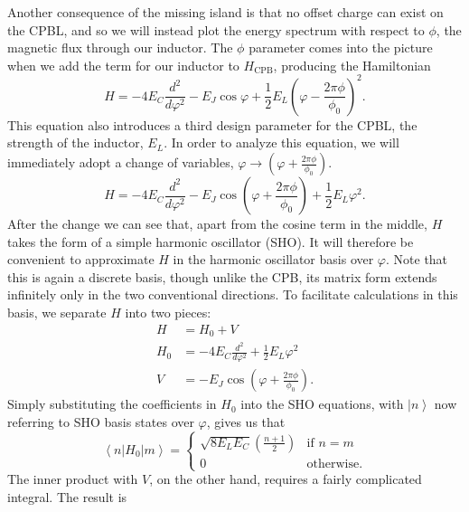 \documentclass[twocolumn]{revtex4}
\newcommand{\ket}[1]{\left| #1 \right>}
\newcommand{\innerp}[3]{\textstyle\left< #1 \left| #2 \right| #3 \right>}
\begin{document}
Another consequence of the missing island is that no offset charge can
exist on the CPBL, and so we will instead plot the energy spectrum
with respect to $\phi$, the magnetic flux through our inductor. The
$\phi$ parameter comes into the picture when we add the term for our
inductor to $H_{\text{CPB}}$, producing the Hamiltonian
\begin{equation}
  H = -4E_C\frac{d^2}{d\varphi^2}-E_J\cos{\varphi}+\frac{1}{2}
  E_L\left(\varphi-\frac{2\pi\phi}{\phi_0} \right)^2.
\end{equation}
This equation also introduces a third design parameter for the CPBL,
the strength of the inductor, $E_L$. In order to analyze this
equation, we will immediately adopt a change of variables, $\varphi
\rightarrow (\varphi + \frac{2\pi\phi}{\phi_0})$.
\begin{equation}
  \label{H}
  H = -4E_C\frac{d^2}{d\varphi^2}-E_J\cos\left(\varphi+
    \frac{2\pi\phi}{\phi_0}\right)+
  \frac{1}{2} E_L\varphi^2.
\end{equation}
After the change we can see that, apart from the cosine term in the
middle, $H$ takes the form of a simple harmonic oscillator (SHO). It
will therefore be convenient to approximate $H$ in the harmonic
oscillator basis over $\varphi$. Note that this is again a discrete
basis, though unlike the CPB, its matrix form extends infinitely only
in the two conventional directions. To facilitate calculations in this
basis, we separate $H$ into two pieces:
\begin{align}
  H & = H_0 + V\\
  H_0 & = -4E_C\frac{d^2}{d\varphi^2} +
  \frac{1}{2} E_L\varphi^2 \\
  V & = -E_J\cos\left(\varphi + \frac{2\pi\phi}{\phi_0}\right).
\end{align}
Simply substituting the coefficients in $H_0$ into the SHO equations,
with $\ket{n}$ now referring to SHO basis states over $\varphi$, gives
us that
\begin{equation}
  \innerp{n}{H_0}{m} = 
  \begin{cases}
    \sqrt{8E_LE_C}\left(\frac{n+1}{2}\right) & \text{if $n=m$} \\
    0 & \text{otherwise.}
  \end{cases}
  \label{inner-H0}
\end{equation}
The inner product with $V$, on the other hand, requires a fairly
complicated integral. The result is
\end{document}
